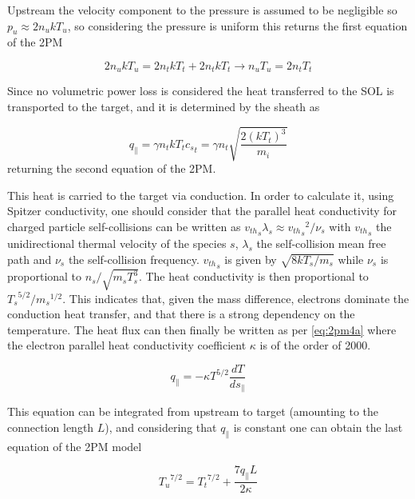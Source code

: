 Upstream the velocity component to the pressure is assumed to be negligible so $p_u \approx 2 n_u k T_u$, so considering the pressure is uniform this returns the first equation of the 2PM

\begin{equation}
2 n_u k T_u = 2n_{t} k T_{t} + 2n_{t} k T_{t} \rightarrow n_u T_u = 2n_{t}T_{t}
\label{eq:2pm2}
\end{equation}

Since no volumetric power loss is considered the heat transferred to the SOL is transported to the target, and it is determined by the sheath as

\begin{equation}
q_{\parallel} =  \gamma n_t k T_t {c_s}_t = \gamma n_t \sqrt{\frac{2(kT_t)^3}{m_i}}
\label{eq:2pm3}
\end{equation}
returning the second equation of the 2PM.

This heat is carried to the target via conduction. In order to calculate it, using Spitzer conductivity\cite{Stangeby2001}, one should consider that the parallel heat conductivity for charged particle self-collisions can be written as ${v_{th}}_s \lambda_s \approx {{v_{th}}_s}^2/{\nu_s}$ with ${v_{th}}_s$ the unidirectional thermal velocity of the species $s$, $\lambda_s$ the self-collision mean free path and $\nu_s$ the self-collision frequency. ${v_{th}}_s$ is given by $\sqrt{8kT_s/{m_s}}$ while $\nu_s$ is proportional to $n_s/\sqrt{m_s T_s^3}$. The heat conductivity is then proportional to $ {T_s}^{5/2} / {m_s}^{1/2}$. This indicates that, given the mass difference, electrons dominate the conduction heat transfer, and that there is a strong dependency on the temperature. The heat flux can then finally be written as per \autoref{eq:2pm4a} where the electron parallel heat conductivity coefficient $\kappa$ is of the order of 2000.\cite{Stangeby2001}

\begin{equation}
q_{\parallel} = -\kappa T^{5/2} \frac{dT}{ds_{\parallel}}
\label{eq:2pm4a}
\end{equation}

This equation can be integrated from upstream to target (amounting to the connection length $L$), and considering that $q_{\parallel}$ is constant one can obtain the last equation of the 2PM model

\begin{equation}
{T_u}^{7/2} = {T_t}^{7/2} + \frac{7 q_{\parallel} L}{2 \kappa}
\label{eq:2pm4}
\end{equation}

